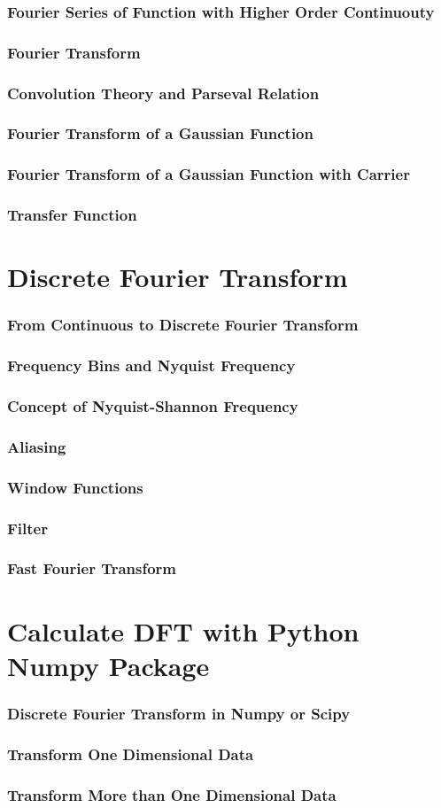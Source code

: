 \documentclass{beamer}
\begin{document}
\begin{frame}[hide]
\frametitle{Fourier Series of Function with Higher Order Continuouty}
\end{frame}
\begin{frame}
\frametitle{Fourier Transform}

\end{frame}
\begin{frame}
\frametitle{Convolution Theory and Parseval Relation}
\end{frame}
\begin{frame}
\frametitle{Fourier Transform of a Gaussian Function}
\end{frame}
\begin{frame}
\frametitle{Fourier Transform of a Gaussian Function with Carrier}
\end{frame}
\begin{frame}
\frametitle{Transfer Function}
\end{frame}
\section{Discrete Fourier Transform}
\begin{frame}
\frametitle{From Continuous to Discrete Fourier Transform}
\end{frame}
\begin{frame}
\frametitle{Frequency Bins and Nyquist Frequency}
\end{frame}
\begin{frame}
\frametitle{Concept of Nyquist-Shannon Frequency}
\end{frame}
\begin{frame}
\frametitle{Aliasing}
\end{frame}
\begin{frame}
\frametitle{Window Functions}
\end{frame}
\begin{frame}
\frametitle{Filter}
\end{frame}
\begin{frame}
\frametitle{Fast Fourier Transform}
\end{frame}
\section{Calculate DFT with Python Numpy Package}
\begin{frame}
\frametitle{Discrete Fourier Transform in Numpy or Scipy}
\end{frame}
\begin{frame}
\frametitle{Transform One Dimensional Data}
\end{frame}
\begin{frame}
\frametitle{Transform More than One Dimensional Data}
\end{frame}
\end{document}
